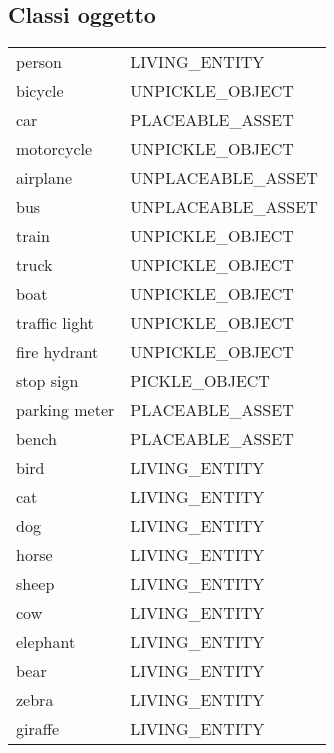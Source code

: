 \subsection{Classi oggetto}
\twocolumn
{}
\tabletail{%
  \hline}
\small
\begin{supertabular}{|l|l|}
  person                & \tiny{LIVING\_ENTITY}     \\
  bicycle               & \tiny{UNPICKLE\_OBJECT  } \\
  car                   & \tiny{PLACEABLE\_ASSET  } \\
  motorcycle            & \tiny{UNPICKLE\_OBJECT  } \\
  airplane              & \tiny{UNPLACEABLE\_ASSET} \\
  bus                   & \tiny{UNPLACEABLE\_ASSET} \\
  train                 & \tiny{UNPICKLE\_OBJECT  } \\
  truck                 & \tiny{UNPICKLE\_OBJECT  } \\
  boat                  & \tiny{UNPICKLE\_OBJECT  } \\
  traffic light         & \tiny{UNPICKLE\_OBJECT  } \\
  fire hydrant          & \tiny{UNPICKLE\_OBJECT  } \\
  stop sign             & \tiny{PICKLE\_OBJECT    } \\
  parking meter         & \tiny{PLACEABLE\_ASSET  } \\
  bench                 & \tiny{PLACEABLE\_ASSET  } \\
  bird                  & \tiny{LIVING\_ENTITY    } \\
  cat                   & \tiny{LIVING\_ENTITY    } \\
  dog                   & \tiny{LIVING\_ENTITY    } \\
  horse                 & \tiny{LIVING\_ENTITY    } \\
  sheep                 & \tiny{LIVING\_ENTITY    } \\
  cow                   & \tiny{LIVING\_ENTITY    } \\
  elephant              & \tiny{LIVING\_ENTITY    } \\
  bear                  & \tiny{LIVING\_ENTITY    } \\
  zebra                 & \tiny{LIVING\_ENTITY    } \\
  giraffe               & \tiny{LIVING\_ENTITY    } \\

\end{supertabular}
